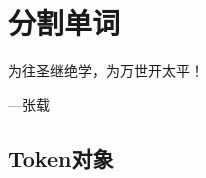 \chapter{分割单词}

\begin{center}
为往圣继绝学，为万世开太平！
\end{center}

\begin{flushright}
---张载  
\end{flushright}

\section{Token对象}
